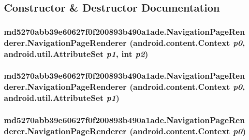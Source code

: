 \subsection{Constructor \& Destructor Documentation}
\hypertarget{classmd5270abb39e60627f0f200893b490a1ade_1_1_navigation_page_renderer_70255e5c28ffb8f5ee71fc6f55817d58}{
\subsubsection[{NavigationPageRenderer}]{\setlength{\rightskip}{0pt plus 5cm}md5270abb39e60627f0f200893b490a1ade.NavigationPageRenderer.NavigationPageRenderer (android.content.Context {\em p0}, \/  android.util.AttributeSet {\em p1}, \/  int {\em p2})}}
\label{classmd5270abb39e60627f0f200893b490a1ade_1_1_navigation_page_renderer_70255e5c28ffb8f5ee71fc6f55817d58}


\hypertarget{classmd5270abb39e60627f0f200893b490a1ade_1_1_navigation_page_renderer_86cfa0a4388feb033448833e6020bfed}{
\subsubsection[{NavigationPageRenderer}]{\setlength{\rightskip}{0pt plus 5cm}md5270abb39e60627f0f200893b490a1ade.NavigationPageRenderer.NavigationPageRenderer (android.content.Context {\em p0}, \/  android.util.AttributeSet {\em p1})}}
\label{classmd5270abb39e60627f0f200893b490a1ade_1_1_navigation_page_renderer_86cfa0a4388feb033448833e6020bfed}


\hypertarget{classmd5270abb39e60627f0f200893b490a1ade_1_1_navigation_page_renderer_5a771deb633fd26fa2d3abbf974fb1ac}{
\subsubsection[{NavigationPageRenderer}]{\setlength{\rightskip}{0pt plus 5cm}md5270abb39e60627f0f200893b490a1ade.NavigationPageRenderer.NavigationPageRenderer (android.content.Context {\em p0})}}
\label{classmd5270abb39e60627f0f200893b490a1ade_1_1_navigation_page_renderer_5a771deb633fd26fa2d3abbf974fb1ac}




